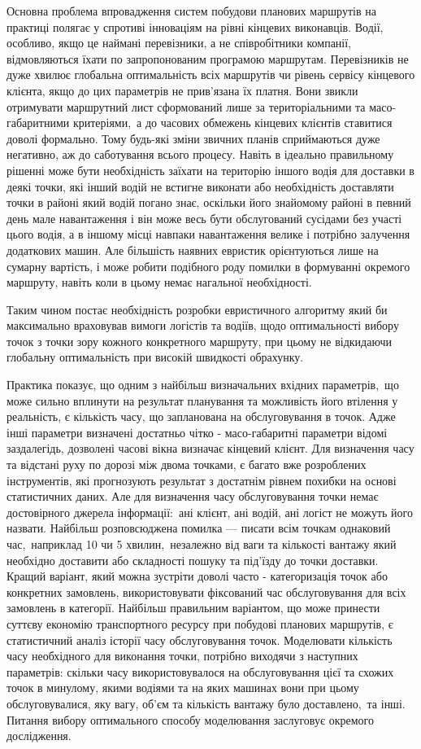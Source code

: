 Основна проблема впровадження систем побудови планових маршрутів на практиці полягає у спротиві інноваціям на рівні кінцевих виконавців. Водії, особливо, якщо це наймані перевізники, а не співробітники компанії, відмовляються їхати по запропонованим програмою маршрутам. Перевізників не дуже хвилює глобальна оптимальність всіх маршрутів чи рівень сервісу кінцевого клієнта, якщо до цих параметрів не прив'язана їх платня. Вони звикли отримувати маршрутний лист сформований лише за територіальними та масо-габаритними критеріями, а до часових обмежень кінцевих клієнтів ставитися доволі формально. Тому будь-які зміни звичних планів сприймаються дуже негативно, аж до саботування всього процесу. Навіть в ідеально правильному рішенні може бути необхідність заїхати на територію іншого водія для доставки в деякі точки, які інший водій не встигне виконати або необхідність доставляти точки в районі який водій погано знає, оскільки його знайомому районі в певний день мале навантаження і він може весь бути обслугований сусідами без участі цього водія, а в іншому місці навпаки навантаження велике і потрібно залучення додаткових машин. Але більшість наявних евристик орієнтуються лише на сумарну вартість, і може робити подібного роду помилки в формуванні окремого маршруту, навіть коли в цьому немає нагальної необхідності.

Таким чином постає необхідність розробки евристичного алгоритму який би максимально враховував вимоги логістів та водіїв, щодо оптимальності вибору точок з точки зору кожного конкретного маршруту, при цьому не відкидаючи глобальну оптимальність при високій швидкості обрахунку.

Практика показує, що одним з найбільш визначальних вхідних параметрів, що може сильно вплинути на результат планування та можливість його втілення у  реальність, є кількість часу, що запланована на обслуговування в точок. Адже інші параметри визначені достатньо чітко - масо-габаритні параметри відомі заздалегідь, дозволені часові вікна визначає кінцевий клієнт. Для визначення часу та відстані руху по дорозі між двома точками, є багато вже розроблених інструментів, які прогнозують результат з достатнім рівнем похибки на основі статистичних даних. Але для визначення часу обслуговування точки немає достовірного джерела інформації: ані клієнт, ані водій, ані логіст не можуть його назвати. Найбільш розповсюджена помилка --- писати всім точкам однаковий час, наприклад 10 чи 5  хвилин, незалежно від ваги та кількості вантажу який необхідно доставити або складності пошуку та під'їзду до точки доставки. Кращий варіант, який можна зустріти доволі часто - категоризація точок або конкретних замовлень, використовувати фіксований час обслуговування для всіх замовлень в категорії. Найбільш правильним варіантом, що може принести суттєву економію транспортного ресурсу при побудові планових маршрутів, є статистичний аналіз історії часу обслуговування точок. Моделювати кількість часу необхідного для виконання точки, потрібно виходячи з наступних параметрів: скільки часу використовувалося на обслуговування цієї та схожих точок в минулому, якими водіями та на яких машинах вони при цьому обслуговувалися, яку вагу, об'єм та кількість вантажу було доставлено, та інші. Питання вибору оптимального способу моделювання заслуговує окремого дослідження.

